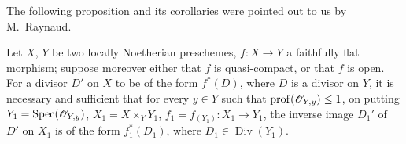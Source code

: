 
The following proposition and its corollaries were pointed out to us by
M.~Raynaud.

\begin{proposition}[21.4.9]
\ifdefined\EGAIVSuppressErratumLabels\else\label{IV.21.4.9}\fi
Let $X$, $Y$ be two locally Noetherian preschemes,
$f:X\to Y$ a faithfully flat morphism; suppose moreover \textup{either} that
$f$ is quasi-compact, \textup{or} that $f$ is open. For a divisor
$D'$ on $X$ to be of the form $f^*(D)$, where $D$ is a divisor on
$Y$, it is necessary and sufficient that for every $y\in Y$ such that
$\operatorname{prof}(\mathscr{O}_{Y,y})\leq 1$, on putting
$Y_1=\operatorname{Spec}(\mathscr{O}_{Y,y})$,
$X_1=X\times_Y Y_1$,
$f_1=f_{(Y_1)}:X_1\to Y_1$,
the inverse image $D_1'$ of $D'$ on $X_1$ is of the form
$f_1^*(D_1)$, where $D_1\in\operatorname{Div}(Y_1)$.
\end{proposition}


